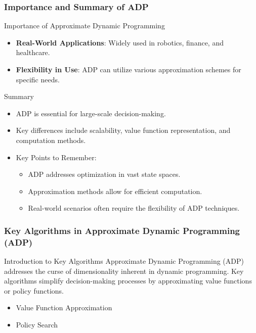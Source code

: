 \documentclass[aspectratio=169]{beamer}
\begin{document}
\begin{frame}[fragile]
    \frametitle{Importance and Summary of ADP}
    \begin{block}{Importance of Approximate Dynamic Programming}
        \begin{itemize}
            \item \textbf{Real-World Applications}: Widely used in robotics, finance, and healthcare.
            \item \textbf{Flexibility in Use}: ADP can utilize various approximation schemes for specific needs.
        \end{itemize}
    \end{block}

    \begin{block}{Summary}
        \begin{itemize}
            \item ADP is essential for large-scale decision-making.
            \item Key differences include scalability, value function representation, and computation methods.
            \item Key Points to Remember:
                \begin{itemize}
                    \item ADP addresses optimization in vast state spaces.
                    \item Approximation methods allow for efficient computation.
                    \item Real-world scenarios often require the flexibility of ADP techniques.
                \end{itemize}
        \end{itemize}
    \end{block}
\end{frame}

\begin{frame}[fragile]
    \frametitle{Key Algorithms in Approximate Dynamic Programming (ADP)}
    \begin{block}{Introduction to Key Algorithms}
        Approximate Dynamic Programming (ADP) addresses the curse of dimensionality inherent in dynamic programming. 
        Key algorithms simplify decision-making processes by approximating value functions or policy functions.
    \end{block}
    \begin{itemize}
        \item Value Function Approximation
        \item Policy Search
    \end{itemize}
\end{frame}
\end{document}
